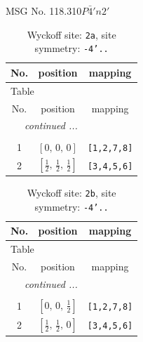\documentclass[fleqn,8pt]{jsarticle}
\begin{document}
\setcounter{MaxMatrixCols}{32}

\renewcommand{\tablename}{Table~}
\renewcommand{\figurename}{Figure~}
\begin{center}
\LARGE
MSG No. 118.310\quad$P\bar{4}'n2'$
\end{center}
\renewcommand{\arraystretch}{1.2}
\begin{longtable}{ccc}
\caption{Wyckoff site: {\tt 2a}, site symmetry: {\tt -4'..}}
 \\
 \hline \hline
No. & position & mapping \\ \hline \endfirsthead

\multicolumn{2}{l}{\tablename\ \thetable{}} \\
 \hline \hline
No. & position & mapping \\ \hline \endhead

 \hline \hline
\multicolumn{2}{r}{\footnotesize\it continued ...} \\ \endfoot

 \hline \hline
\multicolumn{2}{r}{} \\ \endlastfoot

1 & $\left[ 0,\, 0,\, 0 \right]$ & {\tt [1,2,7,8]} \\ \hline
2 & $\left[ \frac{1}{2},\, \frac{1}{2},\, \frac{1}{2} \right]$ & {\tt [3,4,5,6]} \\
\end{longtable}
\renewcommand{\arraystretch}{1.2}
\begin{longtable}{ccc}
\caption{Wyckoff site: {\tt 2b}, site symmetry: {\tt -4'..}}
 \\
 \hline \hline
No. & position & mapping \\ \hline \endfirsthead

\multicolumn{2}{l}{\tablename\ \thetable{}} \\
 \hline \hline
No. & position & mapping \\ \hline \endhead

 \hline \hline
\multicolumn{2}{r}{\footnotesize\it continued ...} \\ \endfoot

 \hline \hline
\multicolumn{2}{r}{} \\ \endlastfoot

1 & $\left[ 0,\, 0,\, \frac{1}{2} \right]$ & {\tt [1,2,7,8]} \\ \hline
2 & $\left[ \frac{1}{2},\, \frac{1}{2},\, 0 \right]$ & {\tt [3,4,5,6]} \\
\end{longtable}
\end{document}
